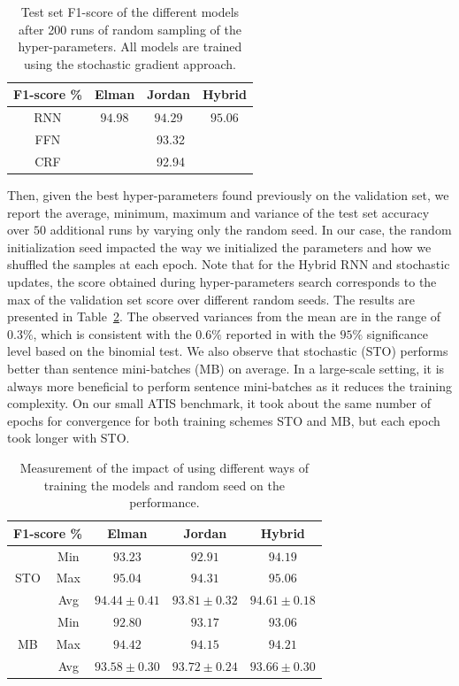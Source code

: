 \begin{table}
\centering
\begin{tabular}{|c|c|c|c|}
\hline
F1-score \% &  Elman  & Jordan & Hybrid \\
\hline
RNN & $94.98$ &   $94.29$ &   $95.06$ \\
\hline
FFN & \multicolumn{3}{c|}{93.32} \\
CRF & \multicolumn{3}{c|}{92.94} \\
\hline
\end{tabular}
\caption{Test set F1-score of the different models after 200 runs of random
sampling of the hyper-parameters. All models are trained using the stochastic
gradient approach.}
\label{tab:f1}
\end{table}

Then, given the best hyper-parameters found previously on the validation set,
we report the average, minimum, maximum and variance of the test set accuracy
over $50$ additional runs by varying only the random seed. In our case, the
random initialization seed impacted the way we initialized the parameters and
how we shuffled the samples at each epoch. Note that for the Hybrid RNN and
stochastic updates, the score obtained during hyper-parameters search
corresponds to the max of the validation set score over different random seeds.
The results are presented in Table~\ref{tab:seed}. The observed variances from the mean are
in the range of $0.3\%$, which is consistent with the $0.6\%$ reported in \citep{rnn24} with
the $95\%$ significance level based on the binomial test. We also observe that
stochastic (STO) performs better than sentence mini-batches (MB) on average. In
a large-scale setting, it is always more beneficial to perform sentence
mini-batches as it reduces the training complexity. On our small ATIS
benchmark, it took about the same number of epochs for convergence for both
training schemes STO and MB, but each epoch took longer with STO.

\begin{table}
\centering
\begin{tabular}{|c|c|c|c|c|}
\hline
\multicolumn{2}{|c|}{F1-score \%} &  Elman &  Jordan & Hybrid \\
\hline
\multirow{3}{*}{STO} & Min & $93.23$ &  $92.91$ &   $94.19$ \\
 &   Max &  $95.04$  &  $94.31$  & $95.06$ \\
        & Avg & $94.44 \pm 0.41$ &  $93.81 \pm0.32$ &  $94.61 \pm0.18$ \\
\hline
\multirow{3}{*}{MB} & Min & $92.80$ &  $93.17$ &   $93.06$ \\
 &   Max &  $94.42$  &  $94.15$  & $94.21$ \\
        & Avg & $93.58 \pm 0.30$ &  $93.72 \pm0.24$ &  $93.66 \pm0.30$ \\
\hline
\end{tabular}
\caption{Measurement of the impact of using different ways of training the models and random seed on the performance.}
\label{tab:seed}
\end{table}
                
